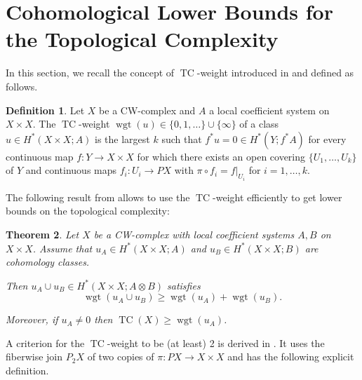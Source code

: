 \documentclass[a4paper,twoside]{article}
\theoremstyle{plain}
\newtheorem{theorem}{Theorem}[section]
\theoremstyle{definition}
\newtheorem{definition}[theorem]{Definition}
\theoremstyle{remark}
\newcommand{\tensor}{\otimes}
\newcommand{\union}{\cup}
\DeclareMathOperator{\TC}{TC}
\DeclareMathOperator{\wgt}{wgt}
\begin{document}
\section{Cohomological Lower Bounds for the Topological Complexity}

In this section, we recall the concept of $\TC$-weight introduced in
\cite{FarberGrant} and defined as follows.
\begin{definition}
  Let $X$ be a CW-complex and $A$ a local coefficient system on $X\times
  X$. The $\TC$-weight $\wgt(u)\in \{0,1,\dots\}\union\{\infty\}$ of a class
  $u\in H^*(X\times X;A)$ is the largest $k$ such that $f^*u=0\in H^*(Y;f^*A)$
  for every continuous map $f\colon Y\to X\times X$ for which there exists an
  open covering $\{U_1,\dots,U_k\}$ of $Y$ and continuous maps $f_i\colon
  U_i\to PX$ with $\pi\circ f_i=f|_{U_i}$ for $i=1,\dots,k$.
\end{definition}

The following result from \cite[Proposition 2]{FarberGrant} allows to use the $\TC$-weight efficiently to get
lower bounds on the topological complexity:

\begin{theorem}\label{theo:wgt_rules}
  Let $X$ be a CW-complex with local coefficient systems $A,B$ on $X\times
  X$. Assume that $u_A\in H^*(X\times X;A)$ and $u_B\in H^*(X\times X;B)$ are
  cohomology classes.

  Then  $u_A\cup u_B \in H^*(X\times X; A\tensor B)$ satisfies
  \begin{equation*}
    \wgt(u_A\cup u_B) \ge \wgt(u_A) + \wgt(u_B).
  \end{equation*}

  Moreover, if $u_A\ne 0$ then $\TC(X)\ge \wgt(u_A)$.
\end{theorem}

A criterion for the $\TC$-weight to be (at least) 2 is derived in
\cite{GrantMescher}. It uses the fiberwise join $P_2X$ of two copies of $\pi \colon PX\to X\times
X$ and has the following explicit definition.
\end{document}
